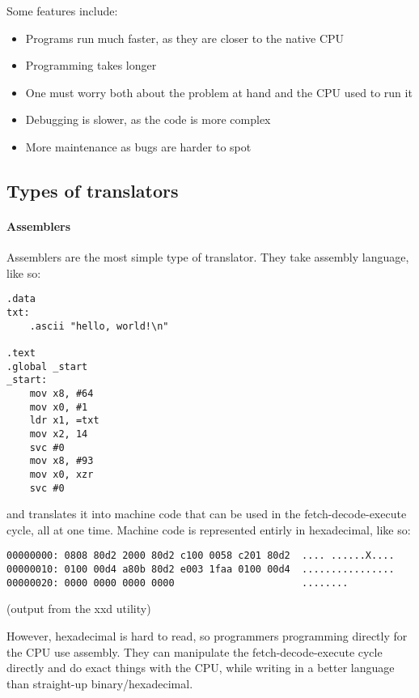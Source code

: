 \documentclass[../main.tex]{subfiles}
\begin{document}
Some features include:

\begin{itemize}
    \item Programs run much faster, as they are closer to the native CPU
    \item Programming takes longer
    \item One must worry both about the problem at hand and the CPU used to run it
    \item Debugging is slower, as the code is more complex
    \item More maintenance as bugs are harder to spot
\end{itemize}

\subsection{Types of translators}

\paragraph{Assemblers}

Assemblers are the most simple type of translator. They take assembly language, like so:

\begin{verbatim}
.data
txt:
    .ascii "hello, world!\n"

.text
.global _start
_start:
    mov x8, #64
    mov x0, #1
    ldr x1, =txt
    mov x2, 14
    svc #0
    mov x8, #93
    mov x0, xzr
    svc #0
\end{verbatim}

and translates it into machine code that can be used in the fetch-decode-execute cycle, all at one time. Machine code is represented entirly in hexadecimal, like so:

\begin{verbatim}
00000000: 0808 80d2 2000 80d2 c100 0058 c201 80d2  .... ......X....
00000010: 0100 00d4 a80b 80d2 e003 1faa 0100 00d4  ................
00000020: 0000 0000 0000 0000                      ........
\end{verbatim}

(output from the {\mono xxd} utility)

However, hexadecimal is hard to read, so programmers programming directly for the CPU use assembly. They can manipulate the fetch-decode-execute cycle directly and do exact things with the CPU, while writing in a better language than straight-up binary/hexadecimal.
\end{document}
